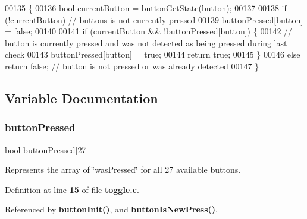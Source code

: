 \begin{DoxyCode}
00135                                        \{
00136     \textcolor{keywordtype}{bool} currentButton = buttonGetState(button);
00137 
00138     \textcolor{keywordflow}{if} (!currentButton) \textcolor{comment}{// buttons is not currently pressed}
00139         buttonPressed[button] = \textcolor{keyword}{false};
00140 
00141     \textcolor{keywordflow}{if} (currentButton && !buttonPressed[button]) \{
00142         \textcolor{comment}{// button is currently pressed and was not detected as being pressed during last check}
00143         buttonPressed[button] = \textcolor{keyword}{true};
00144         \textcolor{keywordflow}{return} \textcolor{keyword}{true};
00145     \}
00146     \textcolor{keywordflow}{else} \textcolor{keywordflow}{return} \textcolor{keyword}{false}; \textcolor{comment}{// button is not pressed or was already detected}
00147 \}
\end{DoxyCode}


\subsection{Variable Documentation}
\mbox{\label{toggle_8c_a66c983ca3b3f041a4e293f814a41198f}} 
\subsubsection{button\+Pressed}
{\footnotesize\ttfamily bool button\+Pressed[27]}

Represents the array of \char`\"{}was\+Pressed\char`\"{} for all 27 available buttons. 

Definition at line \textbf{ 15} of file \textbf{ toggle.\+c}.



Referenced by \textbf{ button\+Init()}, and \textbf{ button\+Is\+New\+Press()}.

